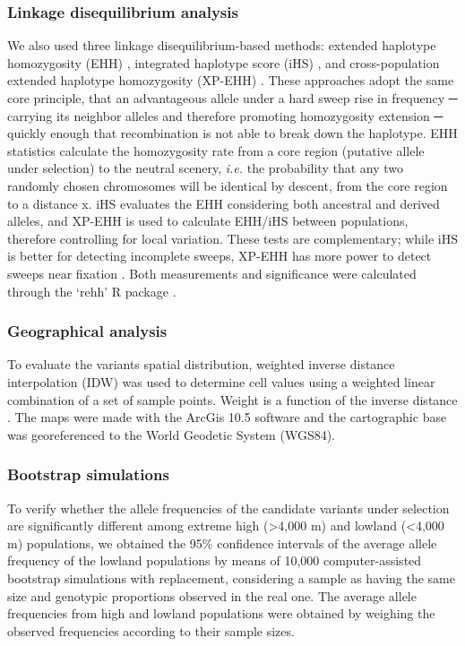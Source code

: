 \subsubsection{Linkage disequilibrium analysis}

We also used three linkage disequilibrium-based methods: extended haplotype homozygosity (EHH) \cite{sabeti_detecting_2002}, integrated haplotype score (iHS) \cite{voight_map_2006}, and cross-population extended haplotype homozygosity (XP-EHH) \cite{sabeti_genome-wide_2007}. These approaches adopt the same core principle, that an advantageous allele under a hard sweep rise in frequency ─ carrying its neighbor alleles and therefore promoting homozygosity extension ─ quickly enough that recombination is not able to break down the haplotype. EHH statistics calculate the homozygosity rate from a core region (putative allele under selection) to the neutral scenery, \textit{i.e.} the probability that any two randomly chosen chromosomes will be identical by descent, from the core region to a distance x. iHS evaluates the EHH considering both ancestral and derived alleles, and XP-EHH is used to calculate EHH/iHS between populations, therefore controlling for local variation. These tests are complementary; while iHS is better for detecting incomplete sweeps, XP-EHH has more power to detect sweeps near fixation \cite{vitti_detecting_2013}. Both measurements and significance were calculated through the ‘rehh’ R package \cite{gautier_rehh_2012}.

\subsubsection{Geographical analysis}

To evaluate the variants spatial distribution, weighted inverse distance interpolation (IDW) was used to determine cell values using a weighted linear combination of a set of sample points. Weight is a function of the inverse distance \cite{watson_refinement_1985}. The maps were made with the ArcGis 10.5 software and the cartographic base was georeferenced to the World Geodetic System (WGS84).

\subsubsection{Bootstrap simulations}

To verify whether the allele frequencies of the candidate variants under selection are significantly different among extreme high (>4,000 m) and lowland (<4,000 m) populations, we obtained the 95\% confidence intervals of the average allele frequency of the lowland populations by means of 10,000 computer-assisted bootstrap simulations with replacement, considering a sample as having the same size and genotypic proportions observed in the real one. The average allele frequencies from high and lowland populations were obtained by weighing the observed frequencies according to their sample sizes.

